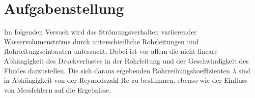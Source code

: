 \section{Aufgabenstellung}
\label{sec:aufgabenstellung}

Im folgenden Versuch wird das Strömungsverhalten variierender Wasservolumenströme durch unterschiedliche Rohrleitungen und Rohrleitungseinbauten untersucht. Dabei ist vor allem die nicht-lineare Abhängigkeit des Druckverlustes in der Rohrleitung und der Geschwindigkeit des Fluides darzustellen. Die sich daraus ergebenden Rohrreibungskoeffizienten $\lambda$ sind in Abhängigkeit von der Reynoldszahl Re zu bestimmen, ebenso wie der Einfluss von Messfehlern auf die Ergebnisse. 